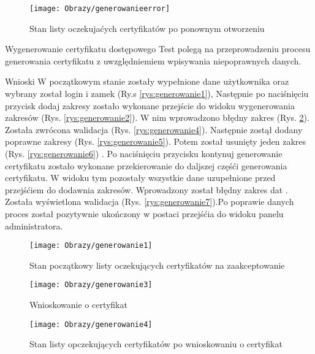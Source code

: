 \begin{enumerate*}
\begin{figure}[ht!]
	\begin{minipage}{0.2\textwidth}
		\texttt{[image: Obrazy/generowanieerror]}
		\caption{Stan listy oczekujaćych certyfikatów po ponownym otworzeniu}
		\label{rys:generowanieCert4}
	\end{minipage}
	
	\end{figure}
	
	
	
	\item  Wygenerowanie certyfikatu dostępowego
	Test polegą na przeprowadzeniu procesu generowania certyfikatu z uwzględniemiem wpisywania niepoprawnych danych.
	
	Wnioski W początkowym stanie zostały wypełnione dane użytkownika oraz wybrany został login i zamek (Ry.s \ref{rys:generowanie1}), Następnie po naciśnięciu przycisk dodaj zakresy zostało wykonane przejście do widoku  wygenerowania zakresów (Rys. \ref{rys:generowanie2}). W nim wprowadzono  błędny zakres (Rys. \ref{rys:generowanie3}). Została zwrócona walidacja (Rys. \ref{rys:generowanie4}). Następnie zostął dodany poprawne zakresy (Rys. \ref{rys:generowanie5}). Potem został usunięty jeden zakres (Rys. \ref{rys:generowanie6})   . Po naciśnięciu przycisku kontynuj generowanie certyfikatu zostało wykonane przekierowanie  do daljszej częśći generowania certyfikatu. W widoku tym pozostały wszystkie dane uzupełnione przed przejśćiem do dodawnia zakresów. Wprowadzony został błędny zakres dat . Została wyświetlona walidacja (Rys. \ref{rys:generowanie7}).Po poprawie danych proces został pozytywnie ukończony w postaci przejśćia do widoku panelu administratora.
	
	
	
		\begin{figure}[ht!]
		
		\begin{minipage}{0.2\textwidth}
			\texttt{[image: Obrazy/generowanie1]}
			\caption{Stan początkowy listy oczekujących certyfikatów na zaakceptowanie }
			\label{rys:generowanie1}
		\end{minipage}
	
		
		\begin{minipage}{0.2\textwidth}
			\texttt{[image: Obrazy/generowanie3]}
			\caption{Wnioskowanie o certyfikat}
			\label{rys:generowanie2}
		\end{minipage}
		\begin{minipage}{0.2\textwidth}
			\texttt{[image: Obrazy/generowanie4]}
			\caption{Stan listy opczekujących certyfikatów po wnioskowaniu o certyfikat}
			\label{rys:generowanie3}
		\end{minipage}
	\end{figure}



\end{enumerate*}
